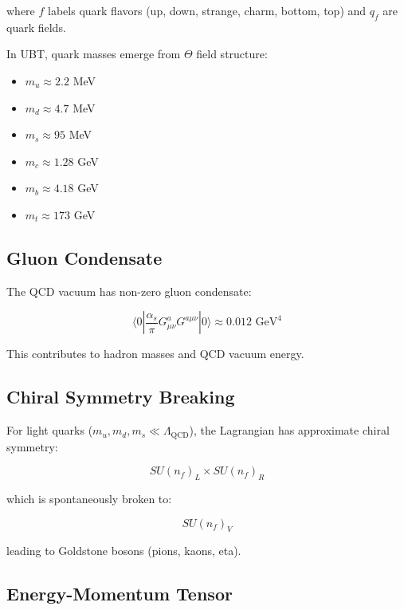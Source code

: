 where $f$ labels quark flavors (up, down, strange, charm, bottom, top) and $q_f$ are quark fields.

In UBT, quark masses emerge from $\Theta$ field structure:

\begin{itemize}
    \item $m_u \approx 2.2$ MeV
    \item $m_d \approx 4.7$ MeV
    \item $m_s \approx 95$ MeV
    \item $m_c \approx 1.28$ GeV
    \item $m_b \approx 4.18$ GeV
    \item $m_t \approx 173$ GeV
\end{itemize}

\subsection{Gluon Condensate}

The QCD vacuum has non-zero gluon condensate:

\begin{equation}
\label{eq:canonical:gluon_condensate}
\langle 0 | \frac{\alpha_s}{\pi} G^a_{\mu\nu} G^{a\mu\nu} | 0 \rangle \approx 0.012 \text{ GeV}^4
\end{equation}

This contributes to hadron masses and QCD vacuum energy.

\subsection{Chiral Symmetry Breaking}

For light quarks ($m_u, m_d, m_s \ll \Lambda_{\text{QCD}}$), the Lagrangian has approximate chiral symmetry:

\begin{equation}
SU(n_f)_L \times SU(n_f)_R
\end{equation}

which is spontaneously broken to:

\begin{equation}
SU(n_f)_V
\end{equation}

leading to Goldstone bosons (pions, kaons, eta).

\subsection{Energy-Momentum Tensor}

